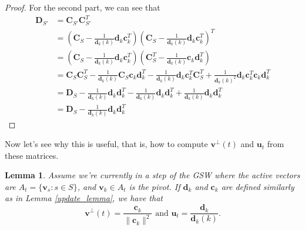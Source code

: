 \documentclass[12pt]{article}
\newtheorem{lemma}[theorem]{Lemma}
\begin{document}
\begin{proof}
For the second part, we can see that \begin{align*}
\textbf{D}_{S'}&=\textbf{C}_{S'}\textbf{C}_{S'}^T\\
&=\left(\textbf{C}_S-\frac{1}{\textbf{d}_k(k)}\textbf{d}_k\textbf{c}_k^T\right)\left(\textbf{C}_S-\frac{1}{\textbf{d}_k(k)}\textbf{d}_k\textbf{c}_k^T\right)^T\\
&=\left(\textbf{C}_S-\frac{1}{\textbf{d}_k(k)}\textbf{d}_k\textbf{c}_k^T\right)\left(\textbf{C}_S^T-\frac{1}{\textbf{d}_k(k)}\textbf{c}_k\textbf{d}_k^T\right)\\
&=\textbf{C}_S\textbf{C}_S^T-\frac{1}{\textbf{d}_k(k)}\textbf{C}_S\textbf{c}_k\textbf{d}_k^T-\frac{1}{\textbf{d}_k(k)}\textbf{d}_k\textbf{c}_k^T\textbf{C}_S^T+\frac{1}{\textbf{d}_k(k)^2}\textbf{d}_k\textbf{c}_k^T\textbf{c}_k\textbf{d}_k^T\\
&=\textbf{D}_S-\frac{1}{\textbf{d}_k(k)}\textbf{d}_k\textbf{d}_k^T-\frac{1}{\textbf{d}_k(k)}\textbf{d}_k\textbf{d}_k^T+\frac{1}{\textbf{d}_k(k)}\textbf{d}_k\textbf{d}_k^T\\
&=\textbf{D}_S-\frac{1}{\textbf{d}_k(k)}\textbf{d}_k\textbf{d}_k^T\end{align*}\end{proof}
Now let's see why this is useful, that is, how to compute $\textbf{v}^\perp(t)$ and $\textbf{u}_t$ from these matrices.
\begin{lemma}
Assume we're currently in a step of the GSW where the active vectors are $A_t=\{\textbf{v}_s:s\in S\}$, and $\textbf{v}_k\in A_t$ is the pivot. If $\textbf{d}_k$ and $\textbf{c}_k$ are defined similarly as in Lemma \ref{update_lemma}, we have that $$\textbf{v}^\perp(t)=\frac{\textbf{c}_k}{\|\textbf{c}_k\|^2}\textrm{ and }\textbf{u}_t=\frac{\textbf{d}_k}{\textbf{d}_k(k)}.$$
\end{lemma}
\end{document}
